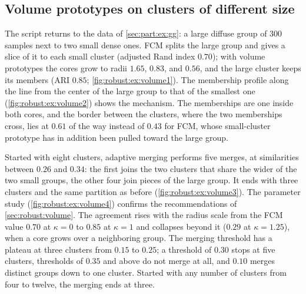 \subsection{Volume prototypes on clusters of different size}\label{sec:robust:ex:volume}

The script  returns to the data of \cref{sec:part:ex:gg}: a large diffuse group of 300 samples next to two small dense ones. FCM splits the large group and gives a slice of it to each small cluster (adjusted Rand index $0.70$); with volume prototypes the cores grow to radii $1.65$, $0.83$, and $0.56$, and the large cluster keeps its members (ARI $0.85$; \cref{fig:robust:ex:volume1}). The membership profile along the line from the center of the large group to that of the smallest one (\cref{fig:robust:ex:volume2}) shows the mechanism. The memberships are one inside both cores, and the border between the clusters, where the two memberships cross, lies at $0.61$ of the way instead of $0.43$ for FCM, whose small-cluster prototype has in addition been pulled toward the large group.


Started with eight clusters, adaptive merging performs five merges, at similarities between $0.26$ and $0.34$: the first joins the two clusters that share the wider of the two small groups, the other four join pieces of the large group. It ends with three clusters and the same partition as before (\cref{fig:robust:ex:volume3}). The parameter study (\cref{fig:robust:ex:volume4}) confirms the recommendations of \cref{sec:robust:volume}. The agreement rises with the radius scale from the FCM value $0.70$ at $\kappa=0$ to $0.85$ at $\kappa=1$ and collapses beyond it ($0.29$ at $\kappa=1.25$), when a core grows over a neighboring group. The merging threshold has a plateau at three clusters from $0.15$ to $0.25$; a threshold of $0.30$ stops at five clusters, thresholds of $0.35$ and above do not merge at all, and $0.10$ merges distinct groups down to one cluster. Started with any number of clusters from four to twelve, the merging ends at three.

